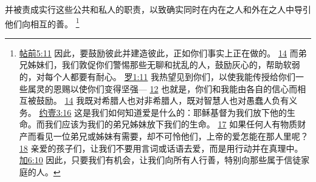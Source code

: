 \documentclass[12pt, a4paper, oneside]{ctexart}
\begin{document}
	并被责成实行这些公共和私人的职责，以致确实同时在内在之人和外在之人中导引他们向相互的善。
	\footnote {
		\href{https://biblehub.com/1_thessalonians/5-11.htm}{帖前5:11} 因此，要鼓励彼此并建造彼此，正如你们事实上正在做的。 
		\href{https://biblehub.com/1_thessalonians/5-14.htm}{14} 而弟兄姊妹们，我们敦促你们警惕那些无聊和扰乱的人，鼓励灰心的，帮助软弱的，对每个人都要有耐心。
		\href{https://biblehub.com/romans/1-11.htm}{罗1:11} 我热望见到你们，以使我能传授给你们一些属灵的恩赐以使你们变得坚强---
		\href{https://biblehub.com/romans/1-12.htm}{12} 也就是，你们和我能由各自的信心而相互被鼓励。
		\href{https://biblehub.com/romans/1-14.htm}{14} 我既对希腊人也对非希腊人，既对智慧人也对愚蠢人负有义务。
		\href{https://biblehub.com/1_john/3-16.htm}{约壹3:16} 这是我们如何知道爱是什么的：耶稣基督为我们放下他的生命。而我们应该为我们的弟兄姊妹放下我们的生命。
		\href{https://biblehub.com/1_john/3-17.htm}{17} 如果任何人有物质财产而看见一位弟兄或姊妹有需要，却不可怜他们，上帝的爱怎能在那人里呢？
		\href{https://biblehub.com/1_john/3-18.htm}{18} 亲爱的孩子们，让我们不要用言词或话语去爱，而是用行动并在真理中。
		\href{https://biblehub.com/galatians/6-10.htm}{加6:10} 因此，只要我们有机会，让我们向所有人行善，特别向那些属于信徒家庭的人。
	}
\end{document}
